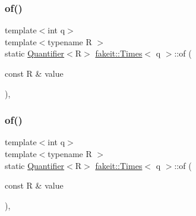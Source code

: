 \mbox{\label{structfakeit_1_1Times_a9c53fb71e7c6d2e295a77909bd971193}} 
\subsubsection{\texorpdfstring{of()}{of()}\hspace{0.1cm}{\footnotesize\ttfamily [6/9]}}
{\footnotesize\ttfamily template$<$int q$>$ \\
template$<$typename R $>$ \\
static \mbox{\hyperlink{structfakeit_1_1Quantifier}{Quantifier}}$<$R$>$ \mbox{\hyperlink{structfakeit_1_1Times}{fakeit\+::\+Times}}$<$ q $>$\+::of (\begin{DoxyParamCaption}\item[{const R \&}]{value }\end{DoxyParamCaption})\hspace{0.3cm}{\ttfamily [inline]}, {\ttfamily [static]}}

\mbox{\label{structfakeit_1_1Times_a9c53fb71e7c6d2e295a77909bd971193}} 
\subsubsection{\texorpdfstring{of()}{of()}\hspace{0.1cm}{\footnotesize\ttfamily [7/9]}}
{\footnotesize\ttfamily template$<$int q$>$ \\
template$<$typename R $>$ \\
static \mbox{\hyperlink{structfakeit_1_1Quantifier}{Quantifier}}$<$R$>$ \mbox{\hyperlink{structfakeit_1_1Times}{fakeit\+::\+Times}}$<$ q $>$\+::of (\begin{DoxyParamCaption}\item[{const R \&}]{value }\end{DoxyParamCaption})\hspace{0.3cm}{\ttfamily [inline]}, {\ttfamily [static]}}

\mbox{\label{structfakeit_1_1Times_a9c53fb71e7c6d2e295a77909bd971193}} 
